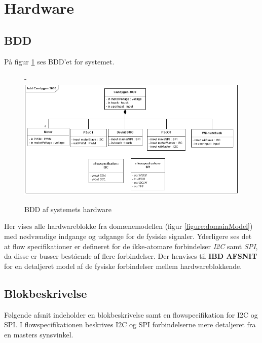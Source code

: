 \section{Hardware}

\subsection{BDD}
\label{afsnit:BDD}
På figur \ref{figure:bddDiagram} ses BDD'et for systemet.

\begin{figure}[H]
	\begin{adjustwidth}{-3cm}{-\rightmargin}
	\centering
	\includegraphics[width=0.9\paperwidth]{SystemArkitektur/images/BDD_overordnet.PNG}
	\caption{BDD af systemets hardware}
	\label{figure:bddDiagram}
	\end{adjustwidth}
\end{figure}

Her vises alle hardwareblokke fra domænemodellen (figur \ref{figure:domainModel}) med nødvændige indgange og udgange for de fysiske signaler. Yderligere ses det at flow specifikationer er defineret for de ikke-atomare forbindelser \textit{I2C} samt \textit{SPI}, da disse er busser bestående af flere forbindelser. Der henvises til \textbf{IBD AFSNIT} for en detaljeret model af de fysiske forbindelser mellem hardwareblokkende.

\subsection{Blokbeskrivelse}
Følgende afsnit indeholder en blokbeskrivelse samt en flowspecifikation for I2C og SPI. I flowspecifikationen beskrives I2C og SPI forbindelserne mere detaljeret fra en masters synsvinkel. \newline


